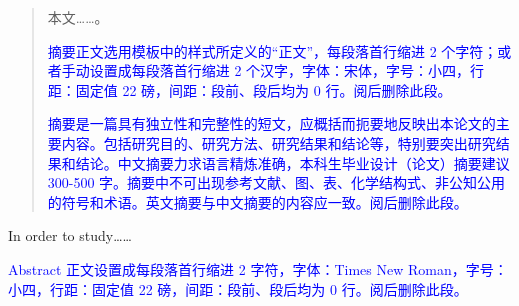 %
%
%
%
%

\begin{abstract}
本文……。

\textcolor{blue}{摘要正文选用模板中的样式所定义的“正文”，每段落首行缩进 2 个字符；或者手动设置成每段落首行缩进 2 个汉字，字体：宋体，字号：小四，行距：固定值 22 磅，间距：段前、段后均为 0 行。阅后删除此段。}

\textcolor{blue}{摘要是一篇具有独立性和完整性的短文，应概括而扼要地反映出本论文的主要内容。包括研究目的、研究方法、研究结果和结论等，特别要突出研究结果和结论。中文摘要力求语言精炼准确，本科生毕业设计（论文）摘要建议 300-500 字。摘要中不可出现参考文献、图、表、化学结构式、非公知公用的符号和术语。英文摘要与中文摘要的内容应一致。阅后删除此段。}

\end{abstract}

\begin{abstract*}
In order to study……

\textcolor{blue}{Abstract 正文设置成每段落首行缩进 2 字符，字体：Times New Roman，字号：小四，行距：固定值 22 磅，间距：段前、段后均为 0 行。阅后删除此段。}
\end{abstract*}
